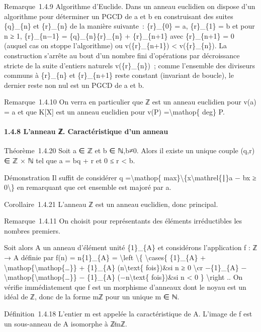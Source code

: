 \documentclass[]{article}
\begin{document}
Remarque~1.4.9 Algorithme d'Euclide. Dans un anneau euclidien on dispose
d'un algorithme pour déterminer un PGCD de a et b en construisant des
suites \{q\}\_\{n\} et \{r\}\_\{n\} de la manière suivante~:
\{r\}\_\{0\} = a, \{r\}\_\{1\} = b et pour n ≥ 1, \{r\}\_\{n−1\} =
\{q\}\_\{n\}\{r\}\_\{n\} + \{r\}\_\{n+1\} avec \{r\}\_\{n+1\} = 0
(auquel cas on stoppe l'algorithme) ou v(\{r\}\_\{n+1\}) \textless{}
v(\{r\}\_\{n\}). La construction s'arrête au bout d'un nombre fini
d'opérations par décroissance stricte de la suite d'entiers naturels
v(\{r\}\_\{n\})~; comme l'ensemble des diviseurs communs à \{r\}\_\{n\}
et \{r\}\_\{n+1\} reste constant (invariant de boucle), le dernier reste
non nul est un PGCD de a et b.

Remarque~1.4.10 On verra en particulier que ℤ est un anneau euclidien
pour v(a) = \textbar{}a\textbar{} et que K{[}X{]} est un anneau
euclidien pour v(P) =\textbackslash{}mathop\{ deg\} P.

\paragraph{1.4.8 L'anneau ℤ. Caractéristique d'un anneau}

Théorème~1.4.20 Soit a ∈ ℤ et b ∈ ℕ,b≠0. Alors il existe un unique
couple (q,r) ∈ ℤ × ℕ tel que a = bq + r et 0 ≤ r \textless{} b.

Démonstration Il suffit de considérer q =\textbackslash{}mathop\{
max\}\textbackslash{}\{x\textbackslash{}mathrel\{∣\}a − bx ≥
0\textbackslash{}\} en remarquant que cet ensemble est majoré par a.

Corollaire~1.4.21 L'anneau ℤ est un anneau euclidien, donc principal.

Remarque~1.4.11 On choisit pour représentants des éléments irréductibles
les nombres premiers.

Soit alors A un anneau d'élément unité \{1\}\_\{A\} et considérons
l'application f : ℤ → A définie par f(n) = n\{1\}\_\{A\} =
\textbackslash{}left \textbackslash{}\{ \textbackslash{}cases\{
\{1\}\_\{A\} +
\textbackslash{}mathop\{\textbackslash{}mathop\{\ldots{}\}\} +
\{1\}\_\{A\} (n\textbackslash{}text\{ fois\})\&si n ≥ 0
\textbackslash{}cr −\{1\}\_\{A\}
−\textbackslash{}mathop\{\textbackslash{}mathop\{\ldots{}\}\} −
\{1\}\_\{A\} (−n\textbackslash{}text\{ fois\})\&si n \textless{} 0 \}
\textbackslash{}right .. On vérifie immédiatement que f est un morphisme
d'anneaux dont le noyau est un idéal de ℤ, donc de la forme mℤ pour un
unique m ∈ ℕ.

Définition~1.4.18 L'entier m est appelée la caractéristique de A.
L'image de f est un sous-anneau de A isomorphe à ℤ∕mℤ.
\end{document}
